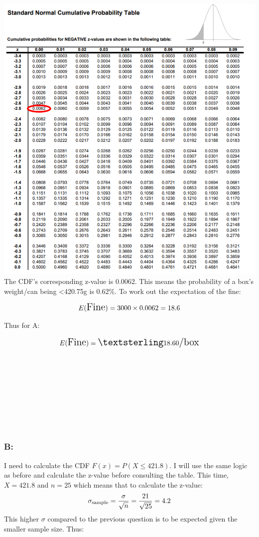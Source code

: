 \documentclass[
]{article}
\begin{document}
\includegraphics{images/ztable.png}\\
The CDF's corresponding z-value is 0.0062. This means the probability of
a box's weight/can being \textless420.75g is 0.62\%. To work out the
expectation of the fine:

\[
\Large
E(\text{Fine}) = 3000 \times 0.0062 = 18.6
\]

Thus for A:

\[
\Large
E(\text{Fine})=£18.60\text{/box}
\]\\
\strut \\
\strut \\
\strut \\
\strut \\

\subsubsection{B:}\label{b}

I need to calculate the CDF \(F(x) = P(X ≤ 421.8)\). I will use the same
logic as before and calculate the z-value before consulting the table.
This time, \(X = 421.8\) and \(n = 25\) which means that to calculate
the z-value: \[
\Large
\sigma_{\text{sample}} = \frac{\sigma}{\sqrt{n}} = \frac{21}{\sqrt{25}} = 4.2
\] This higher \(\sigma\) compared to the previous question is to be
expected given the smaller sample size. Thus:
\end{document}
